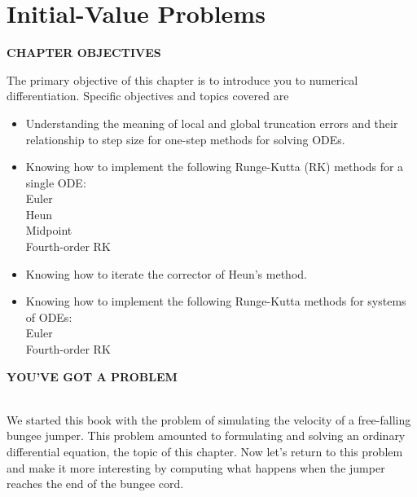 \documentclass[../main.tex]{subfiles}
\begin{document}
\part*{Initial-Value Problems}

\vspace{1,5in}

\begin{center}\begin{Large}\textbf{CHAPTER OBJECTIVES}\end{Large}\end{center}
The primary objective of this chapter is to introduce you to numerical differentiation.
Specific objectives and topics covered are

\begin{itemize}
	\item Understanding the meaning of local and global truncation errors and their
relationship to step size for one-step methods for solving ODEs.
	\item Knowing how to implement the following Runge-Kutta (RK) methods for 
a single ODE:\\
Euler\\
Heun\\
Midpoint\\
Fourth-order RK
	\item Knowing how to iterate the corrector of Heun's method.
	\item Knowing how to implement the following Runge-Kutta methods for systems of ODEs:\\
Euler\\
Fourth-order RK\\
\end{itemize}
\vspace{0.3in}
\begin{Large}\textbf{YOU'VE GOT A PROBLEM}\end{Large}\\
We started this book with the problem of simulating the velocity of a free-falling
bungee jumper. This problem amounted to formulating and solving an ordinary
differential equation, the topic of this chapter. Now let's return to this problem
and make it more interesting by computing what happens when the jumper reaches the end
of the bungee cord.
\end{document}
